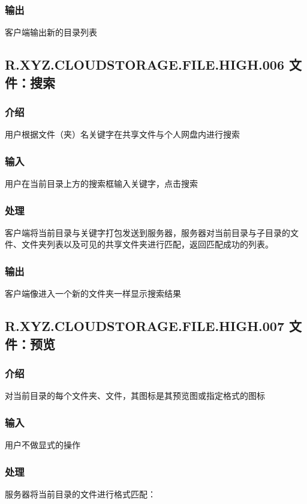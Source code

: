 \subsubsection{输出} 
客户端输出新的目录列表


\subsection{R.XYZ.CLOUDSTORAGE.FILE.HIGH.006 文件：搜索}

\subsubsection{介绍}
用户根据文件（夹）名关键字在共享文件与个人网盘内进行搜索

\subsubsection{输入} 
用户在当前目录上方的搜索框输入关键字，点击搜索

\subsubsection{处理} 
客户端将当前目录与关键字打包发送到服务器，服务器对当前目录与子目录的文件、文件夹列表以及可见的共享文件夹进行匹配，返回匹配成功的列表。

\subsubsection{输出} 
客户端像进入一个新的文件夹一样显示搜索结果

\subsection{R.XYZ.CLOUDSTORAGE.FILE.HIGH.007 文件：预览}

\subsubsection{介绍}
对当前目录的每个文件夹、文件，其图标是其预览图或指定格式的图标

\subsubsection{输入} 
用户不做显式的操作

\subsubsection{处理} 
服务器将当前目录的文件进行格式匹配：

